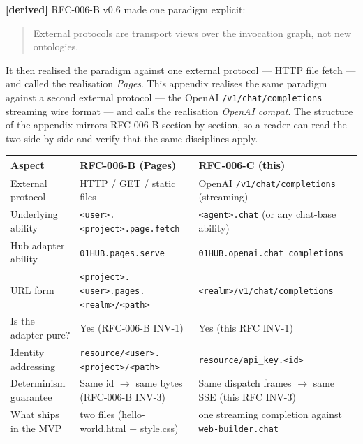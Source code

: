 \documentclass[11pt,a4paper]{article}
\newcommand{\derived}{\textcolor{derivedcolor}{\textbf{[derived]}}\xspace}
\theoremstyle{definition}
\begin{document}
\derived{} RFC-006-B v0.6 made one paradigm explicit:

\begin{quote}
External protocols are transport views over the invocation
graph, not new ontologies.
\end{quote}

It then realised the paradigm against one external protocol ---
HTTP file fetch --- and called the realisation \emph{Pages}.
This appendix realises the same paradigm against a second
external protocol --- the OpenAI \texttt{/v1/chat/completions}
streaming wire format --- and calls the realisation
\emph{OpenAI compat}. The structure of the appendix mirrors
RFC-006-B section by section, so a reader can read the two
side by side and verify that the same disciplines apply.

\begin{center}
\renewcommand{\arraystretch}{1.25}
\begin{tabularx}{\linewidth}{l X X}
\toprule
\textbf{Aspect} & \textbf{RFC-006-B (Pages)} & \textbf{RFC-006-C (this)} \\
\midrule
External protocol           & HTTP / GET / static files                          & OpenAI \texttt{/v1/chat/completions} (streaming) \\
Underlying ability          & \texttt{<user>.<project>.page.fetch}              & \texttt{<agent>.chat} (or any chat-base ability) \\
Hub adapter ability         & \texttt{01HUB.pages.serve}                         & \texttt{01HUB.openai.chat\_completions} \\
URL form                    & \texttt{<project>.<user>.pages.<realm>/<path>}    & \texttt{<realm>/v1/chat/completions} \\
Is the adapter pure?        & Yes (RFC-006-B INV-1)                              & Yes (this RFC INV-1) \\
Identity addressing         & \texttt{resource/<user>.<project>/<path>}          & \texttt{resource/api\_key.<id>} \\
Determinism guarantee       & Same id $\to$ same bytes (RFC-006-B INV-3)        & Same dispatch frames $\to$ same SSE (this RFC INV-3) \\
What ships in the MVP       & two files (hello-world.html + style.css)           & one streaming completion against \texttt{web-builder.chat} \\
\bottomrule
\end{tabularx}
\end{center}
\end{document}
